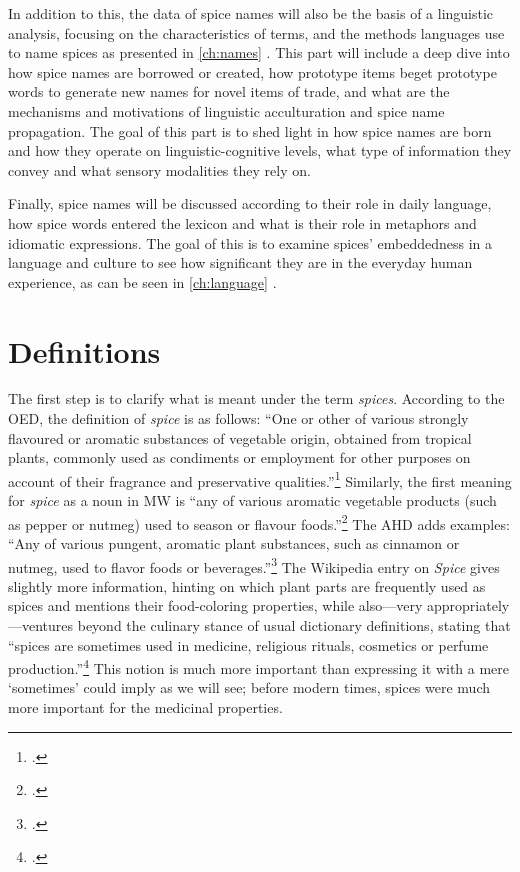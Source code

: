 In addition to this, the data of spice names will also be the basis of a linguistic analysis, focusing on the characteristics of terms, and the methods languages use to name spices as presented in \cref{ch:names} . This part will include a deep dive into how spice names are borrowed or created, how prototype items beget prototype words to generate new names for novel items of trade, and what are the mechanisms and motivations of linguistic acculturation and spice name propagation. The goal of this part is to shed light in how spice names are born and how they operate on linguistic-cognitive levels, what type of information they convey and what sensory modalities they rely on.


Finally, spice names will be discussed according to their role in daily language, how spice words entered the lexicon and what is their role in metaphors and idiomatic expressions. The goal of this is to examine spices' embeddedness in a language and culture to see how significant they are in the everyday human experience, as can be seen in \cref{ch:language} . 



\section{Definitions}
\label{sec:definitions}

The first step is to clarify what is meant under the term \textit{spices}. According to the \gls{OED}, the definition of \textit{spice} is as follows: ``One or other of various strongly flavoured or aromatic substances of vegetable origin, obtained from tropical plants, commonly used as condiments or employment for other purposes on account of their fragrance and preservative qualities.''\footcite[spice]{oed} Similarly, the first meaning for \textit{spice} as a noun in \gls{MW} is ``any of various aromatic vegetable products (such as pepper or nutmeg) used to season or flavour foods.''\footcite[spice]{mw} The \gls{AHD} adds examples: ``Any of various pungent, aromatic plant substances, such as cinnamon or nutmeg, used to flavor foods or beverages.''\footcite[spice]{ahd} 
The Wikipedia entry on \textit{Spice} gives slightly more information, hinting on which plant parts are frequently used as spices and mentions their food-coloring properties, while also---very appropriately---ventures beyond the culinary stance of usual dictionary definitions, stating that ``spices are sometimes used in medicine, religious rituals, cosmetics or perfume production.''\footcite{wikipedia_spice_2022} This notion is much more important than expressing it with a mere `sometimes' could imply as we will see; before modern times, spices were much more important for the medicinal properties.

